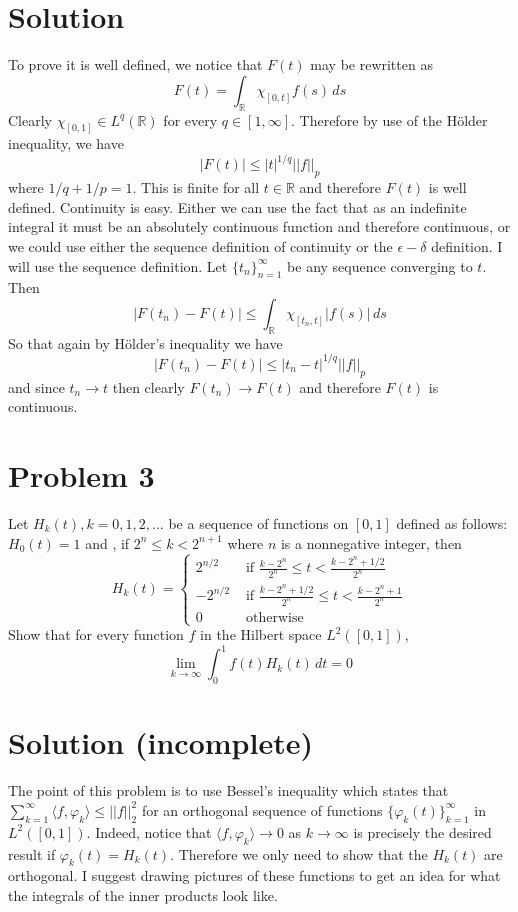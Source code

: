 \documentclass{article}
\newcommand{\field}[1]{\mathbb{#1}}
\begin{document}
\section*{Solution}
To prove it is well defined, we notice that $F(t)$ may be rewritten as
$$F(t)=\int_{\field{R}} \chi_{[0,t]} f(s)\,ds$$
Clearly $\chi_{[0,1]}\in L^q(\field{R})$ for every $q\in[1,\infty]$. Therefore by use of the H\"older inequality, we have
$$|F(t)|\leq |t|^{1/q}||f||_p$$
where $1/q+1/p=1$. This is finite for all $t\in\field{R}$ and therefore $F(t)$ is well defined. Continuity is easy. Either we can use the fact that as an indefinite integral it must be an absolutely continuous function and therefore continuous, or we could use either the sequence definition of continuity or the $\epsilon-\delta$ definition. I will use the sequence definition. 
Let $\{t_n\}_{n=1}^\infty$ be any sequence converging to $t$. Then 
$$|F(t_n)-F(t)|\leq\int_{\field{R}}\chi_{[t_n,t]}|f(s)|\,ds$$
So that again by H\"older's inequality we have
$$|F(t_n)-F(t)|\leq |t_n-t|^{1/q}||f||_p$$
and since $t_n\to t$ then clearly $F(t_n)\to F(t)$ and therefore $F(t)$ is continuous.
\section*{Problem 3}
Let $H_k(t),k=0,1,2,...$ be a sequence of functions on $[0,1]$ defined as follows: $H_0(t)=1$ and , if $2^n\leq k <2^{n+1}$ where $n$ is a nonnegative integer, then
$$H_k(t) = \left\{
        \begin{array}{lll}
            2^{n/2} &\text{ if } \frac{k-2^n}{2^n}\leq t <\frac{k-2^n+1/2}{2^n} \\
            -2^{n/2} &\text{ if } \frac{k-2^n+1/2}{2^n}\leq t <\frac{k-2^n+1}{2^n}\\
	 0 &\text{ otherwise } 
        \end{array}
    \right.
$$
Show that for every function $f$ in the Hilbert space $L^2([0,1])$,
$$\lim_{k\to\infty}\int_0^1 f(t)H_k(t)\,dt=0$$
\section*{Solution (incomplete)}
The point of this problem is to use Bessel's inequality which states that\\ $\sum_{k=1}^\infty \langle f, \varphi_k\rangle\leq||f||^2_2$ for an orthogonal sequence of functions $\{\varphi_k(t)\}_{k=1}^\infty$ in $L^2([0,1])$. Indeed, notice that $\langle f,\varphi_k\rangle\to0$ as $k\to\infty$ is precisely the desired result if $\varphi_k(t)=H_k(t)$. Therefore we only need to show that the $H_k(t)$ are orthogonal. I suggest drawing pictures of these functions to get an idea for what the integrals of the inner products look like.
\end{document}
